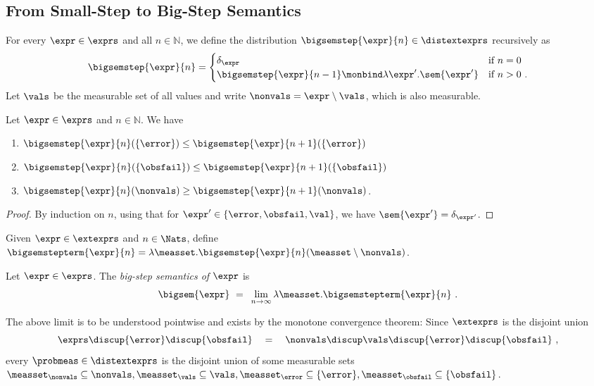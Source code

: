 \subsection{From Small-Step to Big-Step Semantics}
%
%
%
For every $\expr \in \exprs$ and all $n \in \mathbb{N}$, we define the distribution $\bigsemstep{\expr}{n} \in \distextexprs$ recursively as
%
\[
	\bigsemstep{\expr}{n} = 
	\begin{cases}
		\delta_\expr & \text{if $n = 0$} \\
		\bigsemstep{\expr}{n-1} \monbind  \lambda \expr'. \sem{\expr'} & \text{if $n > 0$}~.
	\end{cases}
\]
%
Let $\vals$ be the measurable set of all values and write $\nonvals = \expr \setminus \vals$, which is also measurable.
%
%
\begin{lemma}
	\label{lem:props:bigstepsem}
	Let $\expr \in \exprs$ and $n \in \mathbb{N}$. We have
	\begin{enumerate}
		\item\label{lem:props:bigstepsem1} $\bigsemstep{\expr}{n}(\{\error\}) \leq \bigsemstep{\expr}{n+1}(\{\error\})$
		\item\label{lem:props:bigstepsem2} $\bigsemstep{\expr}{n}(\{\obsfail\}) \leq \bigsemstep{\expr}{n+1}(\{\obsfail\})$
		\item\label{lem:props:bigstepsem3} $\bigsemstep{\expr}{n}(\nonvals) \geq \bigsemstep{\expr}{n+1}(\nonvals)$.
	\end{enumerate}
\end{lemma}
%
\begin{proof}
	By induction on $n$, using that for $\expr' \in \{ \error,\obsfail,\val \}$, we have $\sem{\expr'} = \delta_{\expr'}$.
\end{proof}
%
%
Given $\expr\in\extexprs$ and $n\in\Nats$, define $\bigsemstepterm{\expr}{n} = \lambda \measset. \bigsemstep{\expr}{n}(\measset \setminus \nonvals)$. 
\begin{definition}
	Let $\expr \in \exprs$. The \emph{big-step semantics of $\expr$} is 
	\[
		\bigsem{\expr} ~{}={}~ \lim_{n \to \infty} \lambda \measset.
		\bigsemstepterm{\expr}{n}~.
	\]
\end{definition}
%
The above limit is to be understood pointwise and exists by the monotone convergence theorem:  Since $\extexprs$ is the disjoint union 
%
\[
	 \exprs \discup  \{ \error \} \discup \{ \obsfail \} 
	 \quad {}={} \quad
	 \nonvals \discup \vals \discup \{ \error \} \discup \{ \obsfail \}~,
\]
%
every $\probmeas \in \distextexprs$ is the disjoint union of some measurable sets $\measset_{\nonvals} \subseteq \nonvals, \measset_{\vals}\subseteq\vals, \measset_{\error}\subseteq \{\error\},\measset_{\obsfail}\subseteq\{\obsfail\}$. 
%

